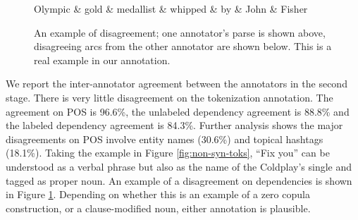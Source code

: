 \documentclass[11pt,a4paper]{article}
\newcommand{\yjcomment}[1]{\textcolor{orange}{[$_\mathrm{L}^\mathrm{Y}$#1]}}
\newcommand{\nascomment}[1]{\textcolor{blue}{[#1 ---\textsc{nas}]}}
\newcommand{\yicomment}[1]{\textcolor{gray}{[#1 ---\textsc{yi}]}}
\begin{document}
\begin{figure}
\centering
\small
\begin{dependency}[edge slant=2, text only label, label style=above]
	\begin{deptext}
		Olympic \& gold \& medallist \& whipped \& by \& John \& Fisher \\
	\end{deptext}
\end{dependency}
\caption{An example of disagreement; one annotator's parse is shown above, disagreeing arcs from the other
  annotator are shown below. This is a real example in our annotation.}\label{fig:disagree}
\end{figure}

We report the inter-annotator agreement between the annotators
in the second stage. There is very little disagreement on the
tokenization annotation. %
The agreement on POS is 96.6\%, the unlabeled
dependency agreement is 88.8\% and the labeled dependency agreement
is 84.3\%. Further analysis shows the major disagreements on POS
involve entity names (30.6\%) %
and topical hashtags (18.1\%).
Taking the example in Figure \ref{fig:non-syn-toks}, ``Fix you'' 
can
be understood as a verbal phrase but also as the name of the Coldplay's
single and tagged as proper noun. 
An example of a disagreement on
dependencies is shown in Figure \ref{fig:disagree}.  Depending on
whether this is an example of a zero copula construction, or a clause-modified
noun, either annotation is plausible.
\end{document}

